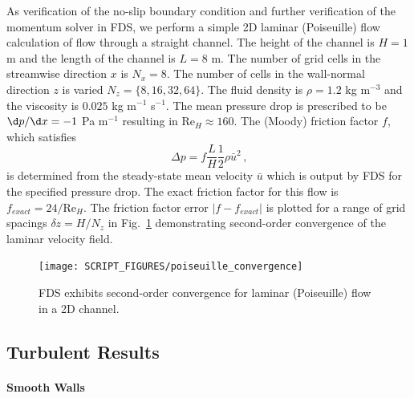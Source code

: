 \documentclass[11pt]{book}
\begin{document}
As verification of the no-slip boundary condition and further verification of the momentum solver in FDS, we perform a simple 2D laminar (Poiseuille) flow calculation of
flow through a straight channel.
The height of the channel is $H=1$ m and the length of the channel is $L=8$ m.
The number of grid cells in the streamwise direction $x$ is $N_x = 8$.  The number of cells in the wall-normal direction $z$ is varied $N_z = \{8,16,32,64\}$.
The fluid density is $\rho = 1.2$ kg m$^{-3}$ and the viscosity is $0.025$ kg m$^{-1}$ s$^{-1}$.
The mean pressure drop is prescribed to be $\d p/ \d x = -1$ Pa m$^{-1}$ resulting in Re$_H \approx 160$.  The (Moody) friction factor $f$, which satisfies
\begin{equation}
\label{eqn_moodyf}
\Delta p = f \frac{L}{H} \frac{1}{2} \rho \bar{u}^2 \,\mbox{,}
\end{equation}
is determined from the steady-state mean velocity $\bar{u}$ which is output by FDS for the specified pressure drop.  The exact friction factor for this flow is $f_{exact} = 24/\mbox{Re}_H$.  The friction factor error $|f-f_{exact}|$ is plotted for a range of grid spacings $\delta z = H/N_z$ in Fig.~\ref{fig_poiseuille_convergence} demonstrating second-order convergence of the laminar velocity field.
\begin{figure}
\centering
\texttt{[image: SCRIPT\_FIGURES/poiseuille\_convergence]}
\caption[Convergence for laminar (Poiseuille) flow in a 2D channel]{FDS exhibits second-order convergence for laminar (Poiseuille) flow in a 2D channel.}
\label{fig_poiseuille_convergence}
\end{figure}

\subsection{Turbulent Results}
\label{turbulent}

\paragraph{Smooth Walls}
\end{document}
